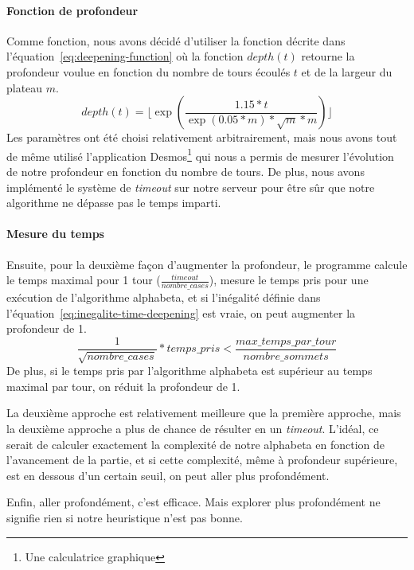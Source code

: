 \paragraph{Fonction de profondeur}
Comme fonction, nous avons décidé d'utiliser la fonction décrite dans l'équation~\ref{eq:deepening-function} où la fonction
$depth(t)$ retourne la profondeur voulue en fonction du nombre de tours écoulés $t$ et de la largeur du plateau $m$.
\begin{equation}
	depth(t) = \lfloor\exp\left(\frac{1.15*t}{\exp(0.05*m)*\sqrt{m}*m}\right)\rfloor
	\label{eq:deepening-function}
\end{equation}
Les paramètres ont été choisi relativement arbitrairement, mais nous avons tout de même
utilisé l'application Desmos\footnote{Une calculatrice graphique} qui nous a permis de mesurer
l'évolution de notre profondeur en fonction du nombre de tours. De plus, nous avons implémenté
le système de \textit{timeout} sur notre serveur pour être sûr que notre algorithme ne dépasse pas le temps imparti.

\paragraph{Mesure du temps}
Ensuite, pour la deuxième façon d'augmenter la profondeur, le programme calcule
le temps maximal pour 1 tour ($\frac{timeout}{nombre\_cases}$),
mesure le temps pris pour une exécution de l'algorithme alphabeta, et
si l'inégalité définie dans l'équation~\ref{eq:inegalite-time-deepening} est vraie,
on peut augmenter la profondeur de 1.
\begin{equation}
	\frac{1}{\sqrt{nombre\_cases}}*temps\_pris < \frac{max\_temps\_par\_tour}{nombre\_sommets}
	\label{eq:inegalite-time-deepening}
\end{equation}
De plus, si le temps pris par l'algorithme alphabeta est supérieur au temps maximal par tour,
on réduit la profondeur de 1.

La deuxième approche est relativement meilleure que la première approche, mais la deuxième approche a plus
de chance de résulter en un \textit{timeout}. L'idéal, ce serait de calculer exactement la complexité de notre alphabeta en fonction
de l'avancement de la partie, et si cette complexité, même à profondeur supérieure, est en dessous d'un certain seuil, on peut
aller plus profondément.

Enfin, aller profondément, c'est efficace. Mais explorer plus profondément
ne signifie rien si notre heuristique n'est pas bonne.

